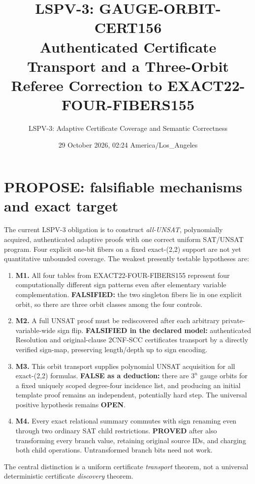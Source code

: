 \documentclass[11pt]{article}
\title{LSPV-3: GAUGE-ORBIT-CERT156\\Authenticated Certificate Transport and a Three-Orbit Referee Correction to EXACT22-FOUR-FIBERS155}
\author{LSPV-3: Adaptive Certificate Coverage and Semantic Correctness}
\date{29 October 2026, 02:24 America/Los\_Angeles}
\begin{document}
\maketitle
\begin{center}\end{center}

\section{PROPOSE: falsifiable mechanisms and exact target}
The current LSPV-3 obligation is to construct \emph{all-UNSAT}, polynomially acquired, authenticated adaptive proofs with one correct uniform SAT/UNSAT program. Four explicit one-bit fibers on a fixed exact-(2,2) support are not yet quantitative unbounded coverage. The weakest presently testable hypotheses are:
\begin{enumerate}
\item[] \textbf{M1.} All four tables from EXACT22-FOUR-FIBERS155 represent four computationally different sign patterns even after elementary variable complementation. \textbf{FALSIFIED:} the two singleton fibers lie in one explicit orbit, so there are three orbit classes among the four controls.
\item[] \textbf{M2.} A full UNSAT proof must be rediscovered after each arbitrary private-variable-wide sign flip. \textbf{FALSIFIED in the declared model:} authenticated Resolution and original-clause 2CNF-SCC certificates transport by a directly verified sign-map, preserving length/depth up to sign encoding.
\item[] \textbf{M3.} This orbit transport supplies polynomial UNSAT acquisition for all exact-(2,2) formulas. \textbf{FALSE as a deduction:} there are $3^n$ gauge orbits for a fixed uniquely scoped degree-four incidence list, and producing an initial template proof remains an independent, potentially hard step. The universal positive hypothesis remains \textbf{OPEN}.
\item[] \textbf{M4.} Every exact relational summary commutes with sign renaming even through two ordinary SAT child restrictions. \textbf{PROVED} after also transforming every branch value, retaining original source IDs, and charging both child operations. Untransformed branch bits need not work.
\end{enumerate}
The central distinction is a uniform certificate \emph{transport} theorem, not a universal deterministic certificate \emph{discovery} theorem.
\end{document}
